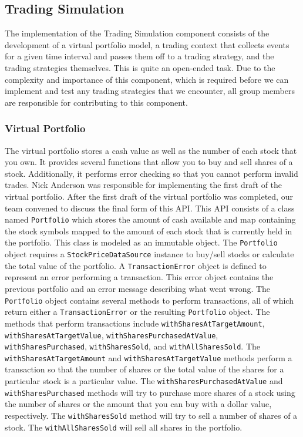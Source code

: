 \subsection{Trading Simulation}

The implementation of the Trading Simulation component consists of the development of a virtual portfolio model, a trading context that collects events for a given time interval and passes them off to a trading strategy, and the trading strategies themselves. This is quite an open-ended task. Due to the complexity and importance of this component, which is required before we can implement and test any trading strategies that we encounter, all group members are responsible for contributing to this component.

\subsubsection{Virtual Portfolio}

The virtual portfolio stores a cash value as well as the number of each stock that you own. It provides several functions that allow you to buy and sell shares of a stock. Additionally, it performs error checking so that you cannot perform invalid trades. Nick Anderson was responsible for implementing the first draft of the virtual portfolio. After the first draft of the virtual portfolio was completed, our team convened to discuss the final form of this API. This API consists of a class named \texttt{Portfolio} which stores the amount of cash available and map containing the stock symbols mapped to the amount of each stock that is currently held in the portfolio. This class is modeled as an immutable object. The \texttt{Portfolio} object requires a \texttt{StockPriceDataSource} instance to buy/sell stocks or calculate the total value of the portfolio. A \texttt{TransactionError} object is defined to represent an error performing a transaction. This error object contains the previous portfolio and an error message describing what went wrong. The \texttt{Portfolio} object contains several methods to perform transactions, all of which return either a \texttt{TransactionError} or the resulting \texttt{Portfolio} object. The methods that perform transactions include \texttt{withSharesAtTargetAmount}, \texttt{withSharesAtTargetValue}, \texttt{withSharesPurchasedAtValue},
\texttt{withSharesPurchased}, \texttt{withSharesSold}, and \texttt{withAllSharesSold}. The \texttt{withSharesAtTargetAmount} and \texttt{withSharesAtTargetValue} methods perform a transaction so that the number of shares or the total value of the shares for a particular stock is a particular value. The \texttt{withSharesPurchasedAtValue} and \texttt{withSharesPurchased} methods will try to purchase more shares of a stock using the number of shares or the amount that you can buy with a dollar value, respectively. The \texttt{withSharesSold} method will try to sell a number of shares of a stock. The \texttt{withAllSharesSold} will sell all shares in the portfolio.
 
